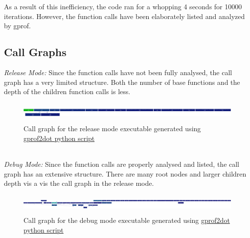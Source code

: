 \documentclass[11pt]{article}
\begin{document}
As a result of this inefficiency, the code ran for a whopping 4 seconds for 10000 iterations. However, the function calls have been elaborately listed and analyzed by gprof.
\\
\subsection{Call Graphs}
\textit{Release Mode:}
Since the function calls have not been fully analysed, the call graph has a very limited structure. Both the number of base functions and the depth of the children function calls is less.
\begin{figure}[h]
\centering
\includegraphics[width=15cm, height=1cm]{out1.png}
\caption{Call graph for the release mode executable generated using \href{https://code.google.com/p/jrfonseca/wiki/Gprof2Dot}{gprof2dot python script}}
\end{figure}
\\
\textit{Debug Mode:}
Since the function calls are properly analysed and listed, the call graph has an extensive structure. There are many root nodes and larger children depth vis a vis the call graph in the release mode.
\begin{figure}[h]
\centering
\includegraphics[width=15cm, height=1cm]{out2.png}
\caption{Call graph for the debug mode executable generated using \href{https://code.google.com/p/jrfonseca/wiki/Gprof2Dot}{gprof2dot python script}}
\end{figure}
\\
\end{document}
